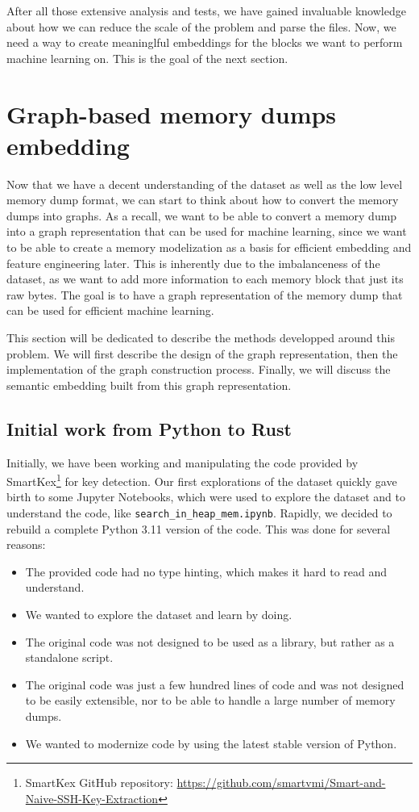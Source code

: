     After all those extensive analysis and tests, we have gained invaluable knowledge about how we can reduce the scale of the problem and parse the files. Now, we need a way to create meaninglful embeddings for the blocks we want to perform machine learning on. This is the goal of the next section.

\section{Graph-based memory dumps embedding}\label{chap:mem_2_graph}
Now that we have a decent understanding of the dataset as well as the low level memory dump format, we can start to think about how to convert the memory dumps into graphs. As a recall, we want to be able to convert a memory dump into a graph representation that can be used for machine learning, since we want to be able to create a memory modelization as a basis for efficient embedding and feature engineering later. This is inherently due to the imbalanceness of the dataset, as we want to add more information to each memory block that just its raw bytes. The goal is to have a graph representation of the memory dump that can be used for efficient machine learning.

This section will be dedicated to describe the methods developped around this problem. We will first describe the design of the graph representation, then the implementation of the graph construction process. Finally, we will discuss the semantic embedding built from this graph representation.

\subsection{Initial work from Python to Rust}

Initially, we have been working and manipulating the code provided by SmartKex\footnote{SmartKex GitHub repository: \url{https://github.com/smartvmi/Smart-and-Naive-SSH-Key-Extraction}} for key detection. Our first explorations of the dataset quickly gave birth to some Jupyter Notebooks, which were used to explore the dataset and to understand the code, like \texttt{search\_in\_heap\_mem.ipynb}. Rapidly, we decided to rebuild a complete Python 3.11 version of the code. This was done for several reasons:

\begin{itemize}
    \item The provided code had no type hinting, which makes it hard to read and understand.
    \item We wanted to explore the dataset and learn by doing.
    \item The original code was not designed to be used as a library, but rather as a standalone script.
    \item The original code was just a few hundred lines of code and was not designed to be easily extensible, nor to be able to handle a large number of memory dumps.
    \item We wanted to modernize code by using the latest stable version of Python.
\end{itemize}

